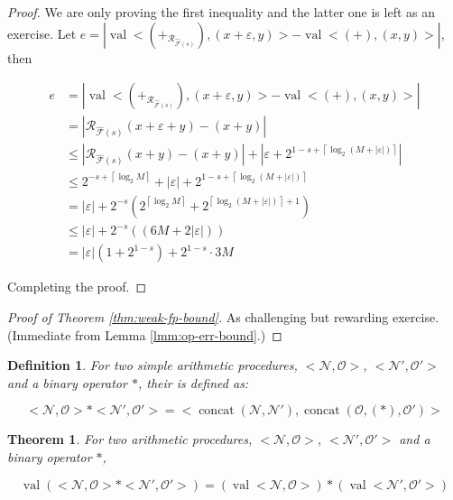 \documentclass{book}
\newtheorem{definition}{Definition}
\newtheorem{theorem}{Theorem}
\theoremstyle{definition}\newtheorem{mechanism}{Mechanism}
\theoremstyle{remark}\newtheorem*{remark}{Remark}
\begin{document}
\begin{proof}
	We are only proving the first inequality and the latter one is left as an exercise. Let $e = \left| \operatorname{val} <(+_{\mathcal{R}_{\hat{\mathcal {F}}(s)}}), (x + \varepsilon, y)> - \operatorname{val} <(+), (x, y)> \right|$, then
	
	\begin{align*}
		e
		&= \left| \operatorname{val} <(+_{\mathcal{R}_{\hat{\mathcal {F}}(s)}}), (x + \varepsilon, y)> - \operatorname{val} <(+), (x, y)> \right|\\
		&= \left| \mathcal{R}_{\hat{\mathcal {F}}(s)}(x + \varepsilon + y) - (x + y) \right|\\
		&\le \left| \mathcal{R}_{\hat{\mathcal {F}}(s)}(x + y) - (x + y) \right| + \left| \varepsilon + 2^{1 - s + \left\lceil \log_2 (M + |\varepsilon|) \right\rceil} \right|\\
		&\le 2^{-s + \left\lceil \log_2 M \right\rceil} + |\varepsilon| + 2^{1 - s+ \left\lceil \log_2 (M + |\varepsilon|) \right\rceil}\\
		&=|\varepsilon| + 2^{-s} \left(2^{\left\lceil \log_2 M  \right\rceil} + 2^{\left\lceil \log_2 (M + |\varepsilon|) \right\rceil + 1}\right)\\
		&\le |\varepsilon| + 2^{-s}((6M + 2|\varepsilon|))\\
		&= |\varepsilon|(1 + 2^{1 - s}) + 2^{1 - s} \cdot 3M
	\end{align*}
	
	Completing the proof.
\end{proof}

\begin{proof}[Proof of Theorem \ref{thm:weak-fp-bound}]
	As challenging but rewarding exercise. (Immediate from Lemma \ref{lmm:op-err-bound}.)
\end{proof}

\begin{definition}
	For two simple arithmetic procedures, $<\mathcal N, \mathcal O>$, $<\mathcal N', \mathcal O'>$ and a binary operator $*$, their  is defined as:
	
	\begin{equation*}
		<\mathcal N, \mathcal O> * <\mathcal N', \mathcal O'> = <\operatorname{concat}(\mathcal N, \mathcal N'), \operatorname{concat}(\mathcal O, (*), \mathcal O')>
	\end{equation*}
\end{definition}

\begin{theorem}
	For two arithmetic procedures, $<\mathcal N, \mathcal O>$, $<\mathcal N', \mathcal O'>$ and a binary operator $*$,
	
	\begin{equation*}
		\operatorname{val} (<\mathcal N, \mathcal O> * <\mathcal N', \mathcal O'>) = (\operatorname{val} <\mathcal N, \mathcal O>) * (\operatorname{ val}<\mathcal N', \mathcal O'>)
	\end{equation*}
\end{theorem}
\end{document}
